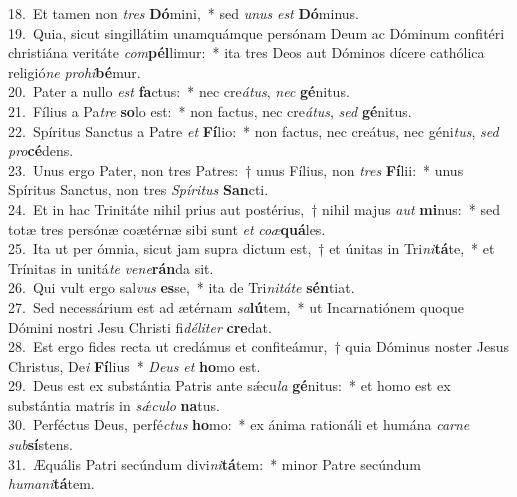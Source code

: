 {18.~}Et tamen non \textit{tres} \textbf{Dó}mini,~* sed \textit{u}\textit{nus} \textit{est} \textbf{Dó}minus.\\
{19.~}Quia, sicut singillátim unamquámque persónam Deum ac Dóminum confitéri christiána veritáte \textit{com}\textbf{pél}limur:~* ita tres Deos aut Dóminos dícere cathólica religió\textit{ne} \textit{pro}\textit{hi}\textbf{bé}mur.\\
{20.~}Pater a nullo \textit{est} \textbf{fa}ctus:~* nec cre\textit{á}\textit{tus}, \textit{nec} \textbf{gé}nitus.\\
{21.~}Fílius a Pa\textit{tre} \textbf{so}lo est:~* non factus, nec cre\textit{á}\textit{tus}, \textit{sed} \textbf{gé}nitus.\\
{22.~}Spíritus Sanctus a Patre \textit{et} \textbf{Fí}lio:~* non factus, nec creátus, nec géni\textit{tus}, \textit{sed} \textit{pro}\textbf{cé}dens.\\
{23.~}Unus ergo Pater, non tres Patres:~† unus Fílius, non \textit{tres} \textbf{Fí}lii:~* unus Spíritus Sanctus, non tres \textit{Spí}\textit{ri}\textit{tus} \textbf{San}cti.\\
{24.~}Et in hac Trinitáte nihil prius aut postérius,~† nihil majus \textit{aut} \textbf{mi}nus:~* sed totæ tres persónæ coætérnæ sibi sunt \textit{et} \textit{co}\textit{æ}\textbf{quá}les.\\
{25.~}Ita ut per ómnia, sicut jam supra dictum est,~† et únitas in Tri\textit{ni}\textbf{tá}te,~* et Trínitas in unitá\textit{te} \textit{ve}\textit{ne}\textbf{rán}da sit.\\
{26.~}Qui vult ergo sal\textit{vus} \textbf{es}se,~* ita de Tri\textit{ni}\textit{tá}\textit{te} \textbf{sén}tiat.\\
{27.~}Sed necessárium est ad ætérnam \textit{sa}\textbf{lú}tem,~* ut Incarnatiónem quoque Dómini nostri Jesu Christi fi\textit{dé}\textit{li}\textit{ter} \textbf{cre}dat.\\
{28.~}Est ergo fides recta ut credámus et confiteámur,~† quia Dóminus noster Jesus Christus, De\textit{i} \textbf{Fí}lius~* \textit{De}\textit{us} \textit{et} \textbf{ho}mo est.\\
{29.~}Deus est ex substántia Patris ante sǽcu\textit{la} \textbf{gé}nitus:~* et homo est ex substántia matris in \textit{sǽ}\textit{cu}\textit{lo} \textbf{na}tus.\\
{30.~}Perféctus Deus, perfé\textit{ctus} \textbf{ho}mo:~* ex ánima rationáli et humána \textit{car}\textit{ne} \textit{sub}\textbf{sí}stens.\\
{31.~}Æquális Patri secúndum divi\textit{ni}\textbf{tá}tem:~* minor Patre secúndum \textit{hu}\textit{ma}\textit{ni}\textbf{tá}tem.\\
